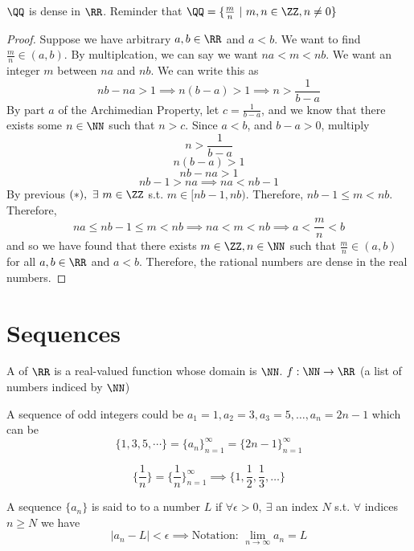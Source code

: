 \documentclass[12pt]{scrartcl}
\begin{document}
\begin{theorem}
  $\QQ$ is dense in $\RR$. Reminder that $\QQ = \{\frac{m}{n} \ | \ m, n \in \ZZ, n \neq 0\}$

  \begin{proof}
    Suppose we have arbitrary $a, b \in \RR$ and $a < b$. We want to find $\frac{m}{n} \in (a, b)$. 
    By multiplcation, we can say we want $na < m < nb$. We want an integer $m$ between
    $na$ and $nb$. We can write this as 
    \[nb - na > 1 \implies n(b-a) > 1 \implies n > \frac{1}{b-a}\]
    By part $a$ of the Archimedian Property, let $c = \frac{1}{b-a}$, and we know that 
    there exists some $n \in \NN$ such that $n > c$. Since $a < b$, and $b - a > 0$, 
    multiply
    \[n > \frac{1}{b-a}\]
    \[n(b-a) > 1\]
    \[nb - na > 1\]
    \[nb - 1 > na \implies na < nb - 1\]
    By previous $(*), \ \exists \ m \in \ZZ$ s.t. $m \in [nb-1, nb)$. Therefore, 
    $nb - 1 \leq m < nb$. Therefore, 
    \[na \leq nb - 1 \leq m < nb \implies na < m < nb \implies a < \frac{m}{n} < b\]
    and so we have found that there exists $m \in \ZZ, n \in \NN$ such that $\frac{m}{n} \in (a, b)$ 
    for all $a, b \in \RR$ and $a < b$. Therefore, the rational numbers are dense in the real numbers. 
  \end{proof}
\end{theorem}

\section{Sequences}

\begin{definition}
  A  of $\RR$ is a real-valued function whose domain is $\NN$. 
  $f: \NN \rightarrow \RR$ (a list of numbers indiced by $\NN$)
\end{definition}

\begin{example}
  A sequence of odd integers could be $a_1 = 1, a_2 = 3, a_3 = 5, \ldots, a_n = 2n-1$
  which can be 
  \[\{1, 3, 5, \cdots\} = \{a_n \}_{n=1}^\infty = \{2n-1\}_{n=1}^\infty\]
\end{example}

\begin{example}
  \[\{\frac{1}{n}\} = \{\frac{1}{n}\}_{n=1}^\infty \implies \{1, \frac{1}{2}, \frac{1}{3}, \ldots\}\]
\end{example}

\begin{definition}
  A sequence $\{a_n\}$ is said to  to a number $L$ if 
  $\forall \epsilon > 0, \ \exists$ an index $N$ s.t. $\forall $ indices $n \geq N$
  we have 
  \[|a_n - L| < \epsilon \implies \text{Notation: } \lim_{n\to\infty}a_n = L\]
\end{definition}
\end{document}
